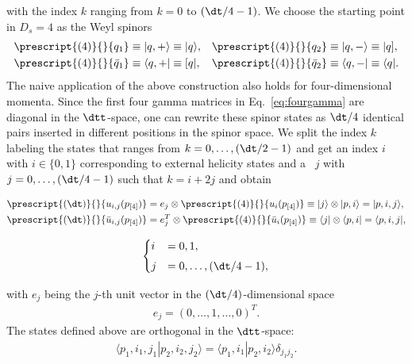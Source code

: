 with the index $k$ ranging from $k=0$ to $(\dt/4-1)$. We choose the
starting point in $D_s=4$ as the Weyl spinors 
\begin{subequations}
\begin{align}
\prescript{(4)}{}{q_{1}}&\equiv|q,+\rangle \equiv |q\rangle, &
\prescript{(4)}{}{q_{2}}&\equiv|q,-\rangle\equiv|q],\\
  \prescript{(4)}{}{\bar{q}_{1}}&\equiv\langle q,+| \equiv [ q|, &
  \prescript{(4)}{}{\bar{q}_{2}}&\equiv\langle q,-|\equiv\langle q|. 
\end{align}
\end{subequations}
The naive application of the above construction also holds for
four-dimensional momenta. Since the first four gamma matrices in
Eq.~\eqref{eq:fourgamma} are diagonal in the $\dtt$-space, one can rewrite these spinor states as $\dt/4$ identical pairs inserted in different
positions in the spinor space. We split the index $k$ labeling the
states that ranges from $k=0,\ldots,(\dt/2-1)$ and get an index $i$
with $i \in \{0,1\}$ corresponding to external helicity states and a
\dttindex{}~$j$ with $j=0,\ldots, (\dt/4-1)$ such that $k=i+2j$ and
obtain
\begin{minipage}{.6\textwidth}
\begin{align*}
    \prescript{(\dt)}{}{u_{i,j}(p_{[4]})} &= e_j \otimes
    \prescript{(4)}{}{u_i(p_{[4]})} \equiv |j\rangle \otimes |p,i\rangle =
  |p,i,j\rangle, \\
\prescript{(\dt)}{}{\bar{u}_{i,j}(p_{[4]})} &= e_j^T \otimes
    \prescript{(4)}{}{\bar{u}_i(p_{[4]})} \equiv \langle j| \otimes
    \langle p,i| =\langle p,i,j|, 
\end{align*}
\end{minipage}
\begin{minipage}{.39\textwidth}
\begin{align}
\begin{cases}\label{eq:4dst}
  i&=0,1, \\[3.5pt]
  j&=0,\ldots,(\dt/4-1), 
\end{cases}
\end{align}
\end{minipage}\vspace{0.5cm}
with $e_j$ being the $j$-th unit vector in the $(\dt/4)$-dimensional space 
\begin{align}
  e_j=(0,\ldots,1,\ldots,0)^T.
\end{align}
The states defined above are orthogonal in the $\dtt$-space:
\begin{align}
  \langle p_1,i_1,j_1 | p_2,i_2,j_2 \rangle =   \langle p_1,i_1 |
  p_2,i_2 \rangle \delta_{j_1j_2}.
\end{align}

